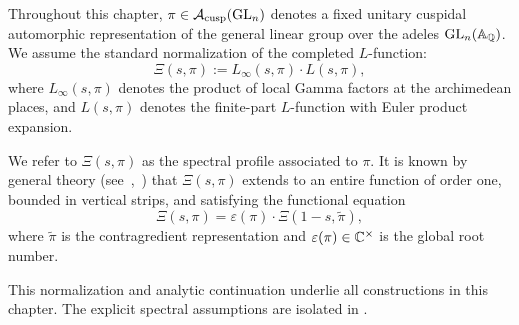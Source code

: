 \begin{remark}
\label{rem:aut_representation_context}
Throughout this chapter, \( \pi \in \mathcal{A}_{\mathrm{cusp}}(\mathrm{GL}_n) \) denotes a fixed unitary cuspidal automorphic representation of the general linear group over the adeles \( \mathrm{GL}_n(\mathbb{A}_{\mathbb{Q}}) \). We assume the standard normalization of the completed \( L \)-function:
\[
\Xi(s, \pi) := L_\infty(s, \pi) \cdot L(s, \pi),
\]
where \( L_\infty(s, \pi) \) denotes the product of local Gamma factors at the archimedean places, and \( L(s, \pi) \) denotes the finite-part \( L \)-function with Euler product expansion.

We refer to \( \Xi(s, \pi) \) as the spectral profile associated to \( \pi \). It is known by general theory (see~\cite{Cogdell2007Lectures},~\cite{Bump1997AutomorphicForms}) that \( \Xi(s, \pi) \) extends to an entire function of order one, bounded in vertical strips, and satisfying the functional equation
\[
\Xi(s, \pi) = \varepsilon(\pi) \cdot \Xi(1 - s, \widetilde{\pi}),
\]
where \( \widetilde{\pi} \) is the contragredient representation and \( \varepsilon(\pi) \in \mathbb{C}^\times \) is the global root number.

This normalization and analytic continuation underlie all constructions in this chapter. The explicit spectral assumptions are isolated in .
\end{remark}
